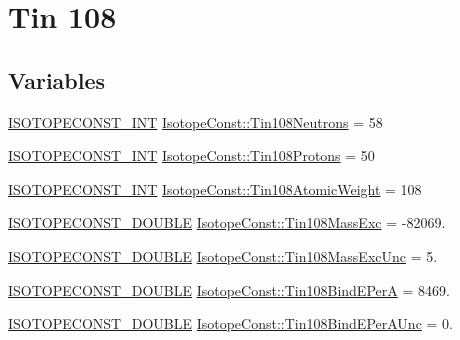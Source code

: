 \hypertarget{group___isotope_const-_tin-_sn108}{}\section{Tin 108}
\label{group___isotope_const-_tin-_sn108}
\subsection*{Variables}
\begin{DoxyCompactItemize}
\item 
\mbox{\hyperlink{group___isotope_const-_macros_ga5f18360b3e99483a35c32d789e62621c}{I\+S\+O\+T\+O\+P\+E\+C\+O\+N\+S\+T\+\_\+\+I\+NT}} \mbox{\hyperlink{group___isotope_const-_tin-_sn108_ga63b177043f77e725d703765bbf19c0cf}{Isotope\+Const\+::\+Tin108\+Neutrons}} = 58
\item 
\mbox{\hyperlink{group___isotope_const-_macros_ga5f18360b3e99483a35c32d789e62621c}{I\+S\+O\+T\+O\+P\+E\+C\+O\+N\+S\+T\+\_\+\+I\+NT}} \mbox{\hyperlink{group___isotope_const-_tin-_sn108_gabcc40af0abf98424e21a83e20d9cf9de}{Isotope\+Const\+::\+Tin108\+Protons}} = 50
\item 
\mbox{\hyperlink{group___isotope_const-_macros_ga5f18360b3e99483a35c32d789e62621c}{I\+S\+O\+T\+O\+P\+E\+C\+O\+N\+S\+T\+\_\+\+I\+NT}} \mbox{\hyperlink{group___isotope_const-_tin-_sn108_ga1ec716b51e06f592b2b6e031770c7c18}{Isotope\+Const\+::\+Tin108\+Atomic\+Weight}} = 108
\item 
\mbox{\hyperlink{group___isotope_const-_macros_ga8f45a7272ce02c0b4c65c44636ed719a}{I\+S\+O\+T\+O\+P\+E\+C\+O\+N\+S\+T\+\_\+\+D\+O\+U\+B\+LE}} \mbox{\hyperlink{group___isotope_const-_tin-_sn108_ga4634919fcc176868d2ed53d66ed87ef0}{Isotope\+Const\+::\+Tin108\+Mass\+Exc}} = -\/82069.
\item 
\mbox{\hyperlink{group___isotope_const-_macros_ga8f45a7272ce02c0b4c65c44636ed719a}{I\+S\+O\+T\+O\+P\+E\+C\+O\+N\+S\+T\+\_\+\+D\+O\+U\+B\+LE}} \mbox{\hyperlink{group___isotope_const-_tin-_sn108_ga9e9387e32e2eabe493f7c245f49f02ce}{Isotope\+Const\+::\+Tin108\+Mass\+Exc\+Unc}} = 5.
\item 
\mbox{\hyperlink{group___isotope_const-_macros_ga8f45a7272ce02c0b4c65c44636ed719a}{I\+S\+O\+T\+O\+P\+E\+C\+O\+N\+S\+T\+\_\+\+D\+O\+U\+B\+LE}} \mbox{\hyperlink{group___isotope_const-_tin-_sn108_ga98c921945d34d6dbac42a47effb3781e}{Isotope\+Const\+::\+Tin108\+Bind\+E\+PerA}} = 8469.
\item 
\mbox{\hyperlink{group___isotope_const-_macros_ga8f45a7272ce02c0b4c65c44636ed719a}{I\+S\+O\+T\+O\+P\+E\+C\+O\+N\+S\+T\+\_\+\+D\+O\+U\+B\+LE}} \mbox{\hyperlink{group___isotope_const-_tin-_sn108_ga92eddd62606448cab5bd7776f5ba97f3}{Isotope\+Const\+::\+Tin108\+Bind\+E\+Per\+A\+Unc}} = 0.

\end{DoxyCompactItemize}
